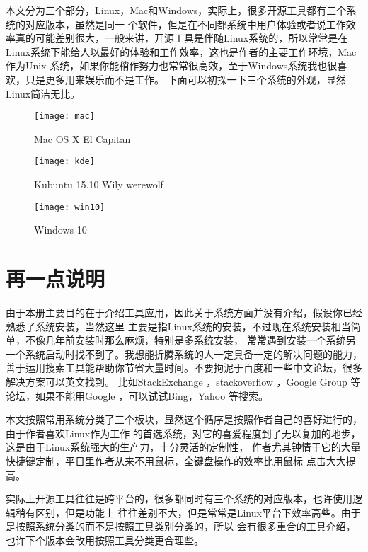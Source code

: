 \documentclass[11pt,fleqn]{book} %
\begin{document}
本文分为三个部分，Linux，Mac和Windows，实际上，很多开源工具都有三个系统的对应版本，虽然是同一
个软件，但是在不同都系统中用户体验或者说工作效率真的可能差别很大，一般来讲，开源工具是伴随Linux系统的，所以常常是在Linux系统下能给人以最好的体验和工作效率，这也是作者的主要工作环境，Mac作为Unix
系统，如果你能稍作努力也常常很高效，至于Windows系统我也很喜欢，只是更多用来娱乐而不是工作。
下面可以初探一下三个系统的外观，显然Linux简洁无比。

\begin{figure}[htpb]
  \centering
  \texttt{[image: mac]}
  \caption{Mac OS X El Capitan}
  \label{fig:mac}
\end{figure}
\begin{figure}[htpb]
  \centering
  \texttt{[image: kde]}
  \caption{Kubuntu 15.10 Wily werewolf}
  \label{fig:kde}
\end{figure}
\begin{figure}[htpb]
  \centering
  \texttt{[image: win10]}
  \caption{Windows 10}
  \label{fig:win10}
\end{figure}

\section{再一点说明}
由于本册主要目的在于介绍工具应用，因此关于系统方面并没有介绍，假设你已经熟悉了系统安装，当然这里
主要是指Linux系统的安装，不过现在系统安装相当简单，不像几年前安装时那么麻烦，特别是多系统安装，
常常遇到安装一个系统另一个系统启动时找不到了。我想能折腾系统的人一定具备一定的解决问题的能力，
善于运用搜索工具能帮助你节省大量时间。不要拘泥于百度和一些中文论坛，很多解决方案可以英文找到。
比如StackExchange \faStackExchange，stackoverflow \faStackOverflow，Google Group \faGroup
等论坛，如果不能用Google \faGoogle，可以试试Bing，Yahoo \faYahoo 等搜索。

本文按照常用系统分类了三个板块，显然这个循序是按照作者自己的喜好进行的，由于作者喜欢Linux作为工作
的首选系统，对它的喜爱程度到了无以复加的地步，这是由于Linux系统强大的生产力，十分灵活的定制性，
作者尤其钟情于它的大量快捷键定制，平日里作者从来不用鼠标，全键盘\faKeyboardO 操作的效率比用鼠标
\faMousePointer 点击大大提高。

实际上开源工具往往是跨平台的，很多都同时有三个系统的对应版本，也许使用逻辑稍有区别，但是功能上
往往差别不大，但是常常是Linux平台下效率高些。由于是按照系统分类的而不是按照工具类别分类的，所以
会有很多重合的工具介绍，也许下个版本会改用按照工具分类更合理些。
\end{document}
